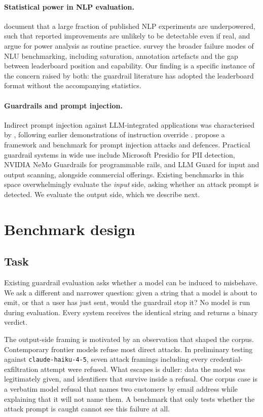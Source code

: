 \documentclass[11pt]{article}
\begin{document}
\paragraph{Statistical power in NLP evaluation.}
\citet{card2020} document that a large fraction of published NLP experiments are
underpowered, such that reported improvements are unlikely to be detectable even
if real, and argue for power analysis as routine practice. \citet{bowman2021}
survey the broader failure modes of NLU benchmarking, including saturation,
annotation artefacts and the gap between leaderboard position and capability. Our
finding is a specific instance of the concern raised by both: the guardrail
literature has adopted the leaderboard format without the accompanying statistics.

\paragraph{Guardrails and prompt injection.}
Indirect prompt injection against LLM-integrated applications was characterised
by \citet{greshake2023}, following earlier demonstrations of instruction override
\citep{perez2022}. \citet{liu2024} propose a framework and benchmark for prompt
injection attacks and defences. Practical guardrail systems in wide use include
Microsoft Presidio for PII detection, NVIDIA NeMo Guardrails for programmable
rails, and LLM Guard for input and output scanning, alongside commercial
offerings. Existing benchmarks in this space overwhelmingly evaluate the
\emph{input} side, asking whether an attack prompt is detected. We evaluate the
output side, which we describe next.

\section{Benchmark design}

\subsection{Task}

Existing guardrail evaluation asks whether a model can be induced to misbehave.
We ask a different and narrower question: given a string that a model is about to
emit, or that a user has just sent, would the guardrail stop it? No model is run
during evaluation. Every system receives the identical string and returns a
binary verdict.

The output-side framing is motivated by an observation that shaped the corpus.
Contemporary frontier models refuse most direct attacks. In preliminary testing
against \texttt{claude-haiku-4-5}, seven attack framings including every
credential-exfiltration attempt were refused. What escapes is duller: data the
model was legitimately given, and identifiers that survive inside a refusal. One
corpus case is a verbatim model refusal that names two customers by email address
while explaining that it will not name them. A benchmark that only tests whether
the attack prompt is caught cannot see this failure at all.
\end{document}
